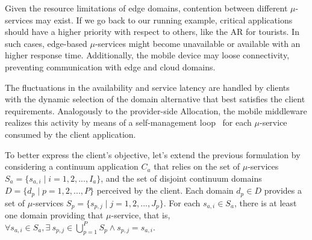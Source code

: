 
Given the resource limitations of edge domains, contention between different $\mu$-services may exist. If we go back to our running example,
critical applications should have a higher priority with respect to others, like the AR for tourists. In such cases, edge-based $\mu$-services might become unavailable or available with an higher response time. Additionally, the mobile device may loose connectivity, preventing communication with edge and cloud domains. 




The fluctuations in the availability and service latency are handled by clients with the dynamic selection of the domain alternative that best satisfies the client requirements. Analogously to the provider-side Allocation, the mobile middleware realizes this activity by means of a self-management loop~\cite{kephart2003vision} for each $\mu$-service consumed by the client application.

To better express the client's objective, let's extend the previous formulation by considering a continuum application $C_a$ that relies on the set of $\mu$-services $S_a = \{s_{a,i} \mid i = 1,2,...,I_a\}$, and the set of disjoint continuum domains $D = \{d_p \mid p = 1,2,...,P\}$ perceived by the client.
Each domain $d_p \in D$ provides a set of $\mu$-services $S_{p} = \{s_{p,j} \mid j =  1,2,..., J_p\}$. For each $s_{a,i} \in S_a$, there is at least one domain providing that $\mu$-service, that is, $\forall s_{a,i} \in S_a, \exists\ s_{p,j} \in \bigcup_{p=1}^{P} S_p \wedge s_{p,j} = s_{a,i}$. 

